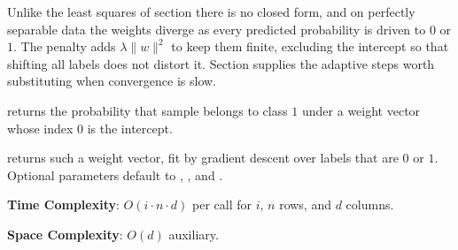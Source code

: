 Unlike the least squares of section  there is no closed form, and on perfectly separable data the weights diverge as every predicted probability is driven to $0$ or $1$. The  penalty adds $\lambda\|w\|^2$ to keep them finite, excluding the intercept so that shifting all labels does not distort it. Section  supplies the adaptive steps worth substituting when convergence is slow.

\begin{compactitem}
  \item {} returns the probability that sample  belongs to class $1$ under a weight vector  whose index $0$ is the intercept.
  \item {} returns such a weight vector, fit by gradient descent over labels that are $0$ or $1$. Optional parameters default to , , and .
\end{compactitem}

\textbf{Time Complexity}: $O(i \cdot n \cdot d)$ per call for  $i$, $n$ rows, and $d$ columns.

\textbf{Space Complexity}: $O(d)$ auxiliary.

